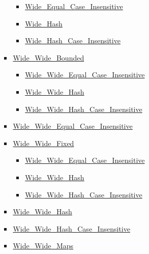 \documentclass[english]{article}
\begin{document}
\begin{scriptsize}
\begin{multicols*}{5}
\begin{itemize}[leftmargin=0mm]
\begin{itemize}[leftmargin=5mm]
\begin{itemize}[leftmargin=5mm]
	  \begin{itemize}[leftmargin=5mm]
	  \item[] \href{http://www.ada-auth.org/standards/22rm/html/RM-A-4-7.html}{Wide\_Equal\_Case\_Insensitive}
	  \item[] \href{http://www.ada-auth.org/standards/22rm/html/RM-A-4-7.html}{Wide\_Hash}
	  \item[] \href{http://www.ada-auth.org/standards/22rm/html/RM-A-4-7.html}{Wide\_Hash\_Case\_Insensitive}
	  \end{itemize}
	\item[] \href{http://www.ada-auth.org/standards/22rm/html/RM-A-4-8.html}{Wide\_Wide\_Bounded}
	  \begin{itemize}[leftmargin=5mm]
	  \item[] \href{http://www.ada-auth.org/standards/22rm/html/RM-A-4-8.html}{Wide\_Wide\_Equal\_Case\_Insensitive}
	  \item[] \href{http://www.ada-auth.org/standards/22rm/html/RM-A-4-8.html}{Wide\_Wide\_Hash}
	  \item[] \href{http://www.ada-auth.org/standards/22rm/html/RM-A-4-8.html}{Wide\_Wide\_Hash\_Case\_Insensitive}
	  \end{itemize}
	\item[] \href{http://www.ada-auth.org/standards/22rm/html/RM-A-4-8.html}{Wide\_Wide\_Equal\_Case\_Insensitive}
	\item[] \href{http://www.ada-auth.org/standards/22rm/html/RM-A-4-8.html}{Wide\_Wide\_Fixed}
	  \begin{itemize}[leftmargin=5mm]
	  \item[] \href{http://www.ada-auth.org/standards/22rm/html/RM-A-4-8.html}{Wide\_Wide\_Equal\_Case\_Insensitive}
	  \item[] \href{http://www.ada-auth.org/standards/22rm/html/RM-A-4-8.html}{Wide\_Wide\_Hash}
	  \item[] \href{http://www.ada-auth.org/standards/22rm/html/RM-A-4-8.html}{Wide\_Wide\_Hash\_Case\_Insensitive}
	  \end{itemize}
	\item[] \href{http://www.ada-auth.org/standards/22rm/html/RM-A-4-8.html}{Wide\_Wide\_Hash}
	\item[] \href{http://www.ada-auth.org/standards/22rm/html/RM-A-4-8.html}{Wide\_Wide\_Hash\_Case\_Insensitive}
	\item[] \href{http://www.ada-auth.org/standards/22rm/html/RM-A-4-8.html}{Wide\_Wide\_Maps}
	  \begin{itemize}[leftmargin=5mm]

\end{itemize}
\end{itemize}
\end{itemize}
\end{itemize}
\end{multicols*}
\end{scriptsize}
\end{document}
